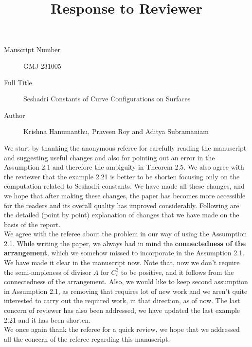 \documentclass[12pt,twoside,reqno]{amsart}
\numberwithin{equation}{section}
\theoremstyle{definition}
\begin{document}
\title{Response to Reviewer}
\begin{description}
\item [Mauscript Number] GMJ 231005 \\
\item [Full Title] Seshadri Constants of Curve Configurations on Surfaces
\item [Author] Krishna Hanumanthu, Praveen Roy and Aditya Subramaniam
\end{description}

We start by thanking the anonymous referee for carefully reading the manuscript and suggesting 
useful changes and also for pointing out an error in the Assumption 2.1 and therefore the ambiguity in Theorem 2.5. We also agree with the reviewer that the example 2.21 is 
better to be shorten focusing only on the computation related to Seshadri constants. We have made all these changes, and we hope that after making these changes, the paper has becomes more accessible for the readers and its overall quality has improved considerably.  Following are the detailed (point by point) explanation of changes that we have made on the basis of the report. \\

We agree with the referee about the problem in our way of using the Assumption 2.1. While writing the paper, we always had in mind the \textbf{connectedness of the arrangement}, 
which we somehow missed to incorporate in the Assumption 2.1. We have made it clear in the manuscript now. Note that, now we don't require the semi-ampleness of divisor $A$ for $C_i^2$ to be positive, and it follows 
from the connectedness of the arrangement. Also, we would like to keep second assumption in Assumption 2.1, as removing that requires lot of new work and we aren't quite interested to carry out the required work, in that direction, 
as of now. The last concern of reviewer has also been addressed, we 
have updated the last example 2.21 and it has been shorten. \\

We once again thank the referee for a quick review, we hope that we addressed all the concern of the referee regarding this manuscript.
\end{document}
